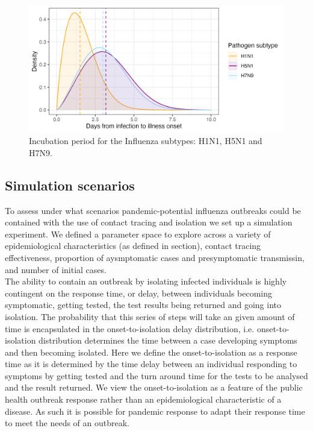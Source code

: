 \documentclass{article}
\begin{document}
\begin{figure}[ht]
\centering
\includegraphics[width=\textwidth]{../plots/incubation_period.png}
\caption{Incubation period for the Influenza subtypes: H1N1, H5N1 and H7N9.}
\label{fig:incub}
\end{figure}

\clearpage

\subsection*{Simulation scenarios}

To assess under what scenarios pandemic-potential influenza outbreaks could be contained with the use of contact tracing and isolation we set up a simulation experiment. We defined a parameter space to explore across a variety of epidemiological characteristics (as defined in  section), contact tracing effectiveness, proportion of aysmptomatic cases and presymptomatic transmissin, and number of initial cases. \\

The ability to contain an outbreak by isolating infected individuals is highly contingent on the response time, or delay, between individuals becoming symptomatic, getting tested, the test results being returned and going into isolation. The probability that this series of steps will take an given amount of time is encapsulated in the onset-to-isolation delay distribution, i.e. onset-to-isolation distribution determines the time between a case developing symptoms and then becoming isolated. Here we define the onset-to-isolation as a response time as it is determined by the time delay between an individual responding to symptoms by getting tested and the turn around time for the tests to be analysed and the result returned. We view the onset-to-isolation as a feature of the public health outbreak response rather than an epidemiological characteristic of a disease. As such it is possible for pandemic response to adapt their response time to meet the needs of an outbreak. \\
\end{document}
